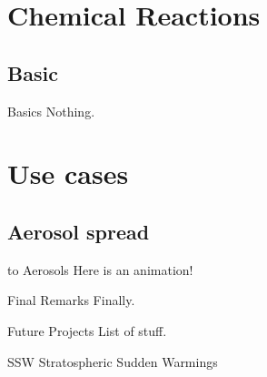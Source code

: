 \documentclass[xcolor=dvipsnames]{beamer} %
\begin{document}
\section{Chemical Reactions}

\subsection{Basic}
\begin{frame}{Basics}
	Nothing.
\end{frame}

\section{Use cases}

\subsection{Aerosol spread}
\begin{frame}{\texorpdfstring{}{SO2} to Aerosols}
    Here is an animation!
\end{frame}

\begin{frame}{Final Remarks}
    Finally.
\end{frame}

\begin{frame}{Future Projects}
    List of stuff.
\end{frame}

\begin{frame}{SSW}
    Stratospheric Sudden Warmings
\end{frame}

\appendix

% 


\end{document}
